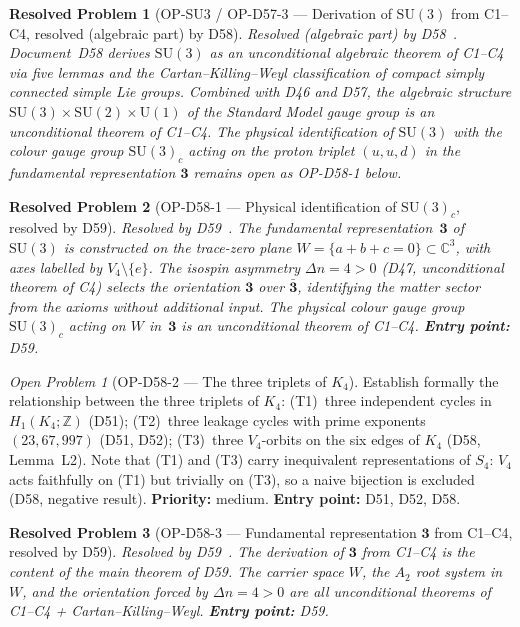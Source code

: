 \documentclass[11pt,a4paper]{article}
\newtheorem{resolvedproblem}{Resolved Problem}
\theoremstyle{plain}
\theoremstyle{definition}
\theoremstyle{remark}
\newtheorem{openproblem}[theorem]{Open Problem}
\begin{document}
\begin{resolvedproblem}[OP-SU3 / OP-D57-3 --- Derivation of $\mathrm{SU}(3)$ from C1--C4, resolved (algebraic part) by D58]
\label{op:SU3}
\textcolor{proofblue}{Resolved (algebraic part) by D58~\cite{D58}.} Document~D58 derives $\mathrm{SU}(3)$ as an unconditional algebraic theorem of C1--C4 via five lemmas and the Cartan--Killing--Weyl classification of compact simply connected simple Lie groups. Combined with D46 and D57, the algebraic structure $\mathrm{SU}(3)\times\mathrm{SU}(2)\times\mathrm{U}(1)$ of the Standard Model gauge group is an unconditional theorem of C1--C4. The physical identification of $\mathrm{SU}(3)$ with the colour gauge group $\mathrm{SU}(3)_c$ acting on the proton triplet $(u,u,d)$ in the fundamental representation $\mathbf{3}$ remains open as OP-D58-1 below.
\end{resolvedproblem}

\begin{resolvedproblem}[OP-D58-1 --- Physical identification of $\mathrm{SU}(3)_c$, resolved by D59]
\label{op:D58one}
\textcolor{proofblue}{Resolved by D59~\cite{D59}.} The fundamental representation~$\mathbf{3}$ of $\mathrm{SU}(3)$ is constructed on the trace-zero plane $W = \{a+b+c=0\}\subset\mathbb{C}^3$, with axes labelled by $V_4\setminus\{e\}$. The isospin asymmetry $\Delta n = 4 > 0$ (D47, unconditional theorem of C4) selects the orientation $\mathbf{3}$ over $\bar{\mathbf{3}}$, identifying the matter sector from the axioms without additional input. The physical colour gauge group $\mathrm{SU}(3)_c$ acting on $W$ in~$\mathbf{3}$ is an unconditional theorem of C1--C4. \textbf{Entry point:} D59.
\end{resolvedproblem}

\begin{openproblem}[OP-D58-2 --- The three triplets of $K_4$]
\label{op:D58two}
Establish formally the relationship between the three triplets of $K_4$: (T1)~three independent cycles in $H_1(K_4;\mathbb{Z})$ (D51); (T2)~three leakage cycles with prime exponents $(23,67,997)$ (D51, D52); (T3)~three $V_4$-orbits on the six edges of $K_4$ (D58, Lemma~L2). Note that (T1) and (T3) carry inequivalent representations of $S_4$: $V_4$ acts faithfully on (T1) but trivially on (T3), so a naive bijection is excluded (D58, negative result). \textbf{Priority:} medium. \textbf{Entry point:} D51, D52, D58.
\end{openproblem}

\begin{resolvedproblem}[OP-D58-3 --- Fundamental representation $\mathbf{3}$ from C1--C4, resolved by D59]
\label{op:D58three}
\textcolor{proofblue}{Resolved by D59~\cite{D59}.} The derivation of $\mathbf{3}$ from C1--C4 is the content of the main theorem of D59. The carrier space $W$, the $A_2$ root system in $W$, and the orientation forced by $\Delta n = 4 > 0$ are all unconditional theorems of C1--C4 + Cartan--Killing--Weyl. \textbf{Entry point:} D59.
\end{resolvedproblem}
\end{document}
